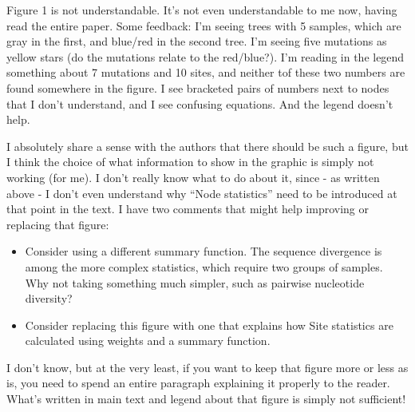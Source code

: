 \begin{point}{}
Figure 1 is not understandable. It's not even understandable to me now, having read the entire paper. Some feedback: I'm seeing trees with 5 samples, which are gray in the first, and blue/red in the second tree. I'm seeing five mutations as yellow stars (do the mutations relate to the red/blue?). I'm reading in the legend something about 7 mutations and 10 sites, and neither tof these two numbers are found somewhere in the figure. I see bracketed pairs of numbers next to nodes that I don't understand, and I see confusing equations. And the legend doesn't help.

I absolutely share a sense with the authors that there should be such a figure, but I think the choice of what information to show in the graphic is simply not working (for me). I don't really know what to do about it, since - as written above - I don't even understand why ``Node statistics'' need to be introduced at that point in the text. I have two comments that might help improving or replacing that figure:
    \begin{itemize}
        \item Consider using a different summary function. The sequence divergence is among the more complex statistics, which require two groups of samples. Why not taking something much simpler, such as pairwise nucleotide diversity?
        \item Consider replacing this figure with one that explains how Site statistics are calculated using weights and a summary function.
    \end{itemize}

I don't know, but at the very least, if you want to keep that figure more or less as is, you need to spend an entire paragraph explaining it properly to the reader. What's written in main text and legend about that figure is simply not sufficient!
\end{point}


